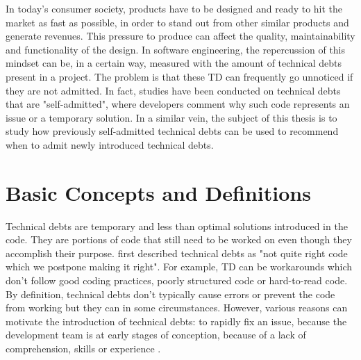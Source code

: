 

\label{sec:Introduction}  


\setlength{\parindent}{5ex} In today's consumer society, products have to be designed and ready to hit the market as fast as possible, in order to stand out from other similar products and generate revenues. This pressure to produce can affect the quality, maintainability and functionality of the design. In software engineering, the repercussion of this mindset can be, in a certain way, measured with the amount of technical debts present in a project. The problem is that these \ac{TD} can frequently go unnoticed if they are not admitted. In fact, studies have been conducted on technical debts that are "self-admitted", where developers comment why such code represents an issue or a temporary solution. In a similar vein, the subject of this thesis is to study how previously self-admitted technical debts can be used to recommend when to admit newly introduced technical debts.

\section{Basic Concepts and Definitions}  


\setlength{\parindent}{5ex} Technical debts are temporary and less than optimal solutions introduced in the code. They are portions of code that still need to be worked on even though they accomplish their purpose. \citet{Cunningham:1992:WPM:157709.157715} first described technical debts as "not quite right code which we postpone making it right". For example, \ac{TD} can be workarounds which don't follow good coding practices, poorly structured code or hard-to-read code. By definition, technical debts don't typically cause errors or prevent the code from working but they can in some circumstances. However, various reasons can motivate the introduction of technical debts: to rapidly fix an issue, because the development team is at early stages of conception, because of a lack of comprehension, skills or experience \citep{Suryanarayana20151}. \par

